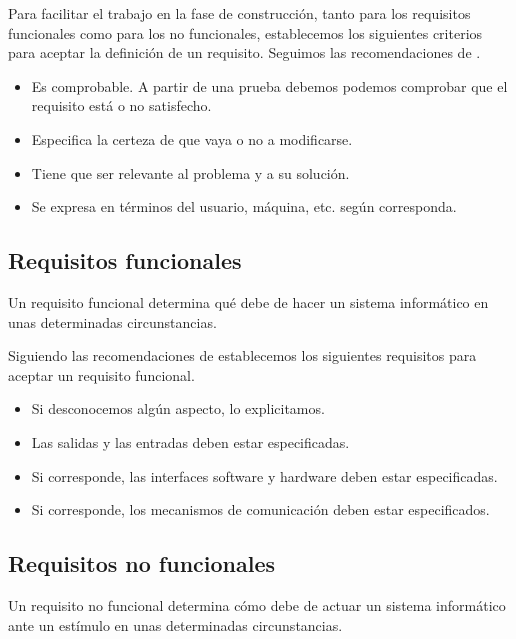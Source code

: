 Para facilitar el trabajo en la fase de construcción, tanto para los requisitos
funcionales como para los no funcionales, establecemos los siguientes criterios
para aceptar la definición de un requisito. Seguimos las recomendaciones de
\cite[Checklist: Requirements]{CodeComplete2}.

\begin{itemize}[noitemsep,nolistsep]
    \item Es comprobable. A partir de una prueba debemos podemos comprobar
          que el requisito está o no satisfecho.
    \item Especifica la certeza de que vaya o no a modificarse.
    \item Tiene que ser relevante al problema y a su solución.
    \item Se expresa en términos del usuario, máquina, etc. según corresponda.
\end{itemize}

\subsection{Requisitos funcionales}

Un requisito funcional determina qué debe de hacer un sistema informático en unas determinadas circunstancias.

Siguiendo las recomendaciones de \cite[Checklist: Requirements]{CodeComplete2} establecemos
los siguientes requisitos para aceptar un requisito funcional.

\begin{itemize}[noitemsep,nolistsep]
    \item Si desconocemos algún aspecto, lo explicitamos.
    \item Las salidas y las entradas deben estar especificadas.
    \item Si corresponde, las interfaces software y hardware deben
          estar especificadas.
    \item Si corresponde, los mecanismos de comunicación deben estar
          especificados.
\end{itemize}

\subsection{Requisitos no funcionales}

Un requisito no funcional determina cómo debe de actuar un sistema informático ante un estímulo en unas determinadas circunstancias.


